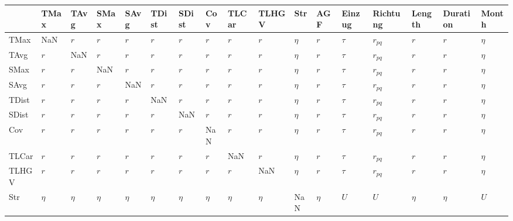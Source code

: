 \begin{tabular}{lllllllllllllllll}
\toprule
{} &      TMax &      TAvg &      SMax &      SAvg &     TDist &     SDist &       Cov &     TLCar &     TLHGV &     Str &       AGF &  Einzug &  Richtung &    Length &  Duration &   Month \\
\midrule
TMax     &       NaN &       $r$ &       $r$ &       $r$ &       $r$ &       $r$ &       $r$ &       $r$ &       $r$ &  $\eta$ &       $r$ &  $\tau$ &  $r_{pq}$ &       $r$ &       $r$ &  $\eta$ \\
TAvg     &       $r$ &       NaN &       $r$ &       $r$ &       $r$ &       $r$ &       $r$ &       $r$ &       $r$ &  $\eta$ &       $r$ &  $\tau$ &  $r_{pq}$ &       $r$ &       $r$ &  $\eta$ \\
SMax     &       $r$ &       $r$ &       NaN &       $r$ &       $r$ &       $r$ &       $r$ &       $r$ &       $r$ &  $\eta$ &       $r$ &  $\tau$ &  $r_{pq}$ &       $r$ &       $r$ &  $\eta$ \\
SAvg     &       $r$ &       $r$ &       $r$ &       NaN &       $r$ &       $r$ &       $r$ &       $r$ &       $r$ &  $\eta$ &       $r$ &  $\tau$ &  $r_{pq}$ &       $r$ &       $r$ &  $\eta$ \\
TDist    &       $r$ &       $r$ &       $r$ &       $r$ &       NaN &       $r$ &       $r$ &       $r$ &       $r$ &  $\eta$ &       $r$ &  $\tau$ &  $r_{pq}$ &       $r$ &       $r$ &  $\eta$ \\
SDist    &       $r$ &       $r$ &       $r$ &       $r$ &       $r$ &       NaN &       $r$ &       $r$ &       $r$ &  $\eta$ &       $r$ &  $\tau$ &  $r_{pq}$ &       $r$ &       $r$ &  $\eta$ \\
Cov      &       $r$ &       $r$ &       $r$ &       $r$ &       $r$ &       $r$ &       NaN &       $r$ &       $r$ &  $\eta$ &       $r$ &  $\tau$ &  $r_{pq}$ &       $r$ &       $r$ &  $\eta$ \\
TLCar    &       $r$ &       $r$ &       $r$ &       $r$ &       $r$ &       $r$ &       $r$ &       NaN &       $r$ &  $\eta$ &       $r$ &  $\tau$ &  $r_{pq}$ &       $r$ &       $r$ &  $\eta$ \\
TLHGV    &       $r$ &       $r$ &       $r$ &       $r$ &       $r$ &       $r$ &       $r$ &       $r$ &       NaN &  $\eta$ &       $r$ &  $\tau$ &  $r_{pq}$ &       $r$ &       $r$ &  $\eta$ \\
Str      &    $\eta$ &    $\eta$ &    $\eta$ &    $\eta$ &    $\eta$ &    $\eta$ &    $\eta$ &    $\eta$ &    $\eta$ &     NaN &    $\eta$ &     $U$ &       $U$ &    $\eta$ &    $\eta$ &     $U$ \\

\end{tabular}
